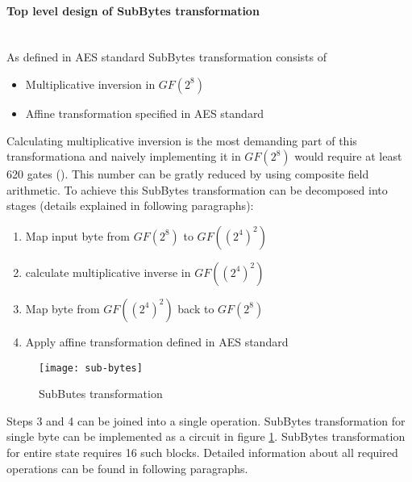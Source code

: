 \paragraph{Top level design of SubBytes transformation}\mbox{}\\
As defined in AES standard \cite{aes-snadard} SubBytes transformation consists of
\begin{itemize}[nolistsep]
\item Multiplicative inversion in $GF(2^8)$
\item Affine transformation specified in AES standard \cite{aes-standard}
\end{itemize}
Calculating multiplicative inversion is the most demanding part of this transformationa and naively implementing it in $GF(2^8)$ would require at least 620 gates (\cite{vlsi}). This number can be gratly reduced by using composite field arithmetic. To achieve this SubBytes transformation can be decomposed into stages (details explained in following paragraphs):
\begin{enumerate}[nolistsep]
\item Map input byte from $GF(2^8)$ to $GF((2^4)^2)$ 
\item calculate multiplicative inverse in $GF((2^4)^2)$
\item Map byte from $GF((2^4)^2)$ back to $GF(2^8)$
\item Apply affine transformation defined in AES standard \cite{aes-standard}
\end{enumerate}



\begin{figure}[!h]
\label{fig:sub-single-byte}
\centering
\texttt{[image: sub-bytes]}
\caption{SubButes transformation}
\end{figure}

Steps 3 and 4 can be joined into a single operation. SubBytes transformation for single byte can be implemented as a circuit in figure \ref{fig:sub-single-byte}. SubBytes transformation for entire state requires 16 such blocks. Detailed information about all required operations can be found in following paragraphs.

